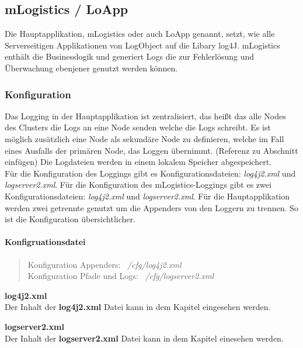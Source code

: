 \subsection{mLogistics / LoApp}
Die Hauptapplikation, mLogistics oder auch LoApp genannt, setzt, wie alle Serverseitigen Applikationen von LogObject auf die Libary log4J. mLogistics enthält die Businesslogik und generiert Logs die zur Fehlerlösung und Überwachung ebenjener genutzt werden können.

\subsubsection{Konfiguration}
Das Logging in der Hauptapplikation ist zentralisiert, das heißt das alle Nodes des Clusters die Logs an eine Node senden welche die Logs schreibt. Es ist möglich zusätzlich eine Node als sekundäre Node zu definieren, welche im Fall eines Ausfalls der primären Node, das Loggen übernimmt. (Referenz zu Abschnitt einfügen)
Die Logdateien werden in einem lokalem Speicher abgespeichert. \\

Für die Konfiguration des Loggings gibt es Konfigurationsdateien: \textit{log4j2.xml} und \textit{logserver2.xml}.
Für die Konfiguration des mLogistics-Loggings gibt es zwei Konfigurationsdateien: \textit{log4j2.xml} und \textit{logserver2.xml}. Für die Hauptapplikation werden zwei getrennte genutzt um die Appenders von den Loggern zu trennen. So ist die Konfiguration übersichtlicher.

\paragraph{Konfigruationsdatei}
\vspace{0.5em}
\begin{quote}
	Konfiguration Appenders: \textit{~/cfg/log4j2.xml} \\
	Konfiguration Pfade und Logs: \textit{~/cfg/logserver2.xml}
\end{quote}

\textbf{log4j2.xml} \\
Der Inhalt der \textbf{log4j2.xml} Datei kann in dem Kapitel \textit{} eingesehen werden.

\textbf{logserver2.xml} \\
Der Inhalt der \textbf{logserver2.xml} Datei kann in dem Kapitel \textit{} einesehen werden.

